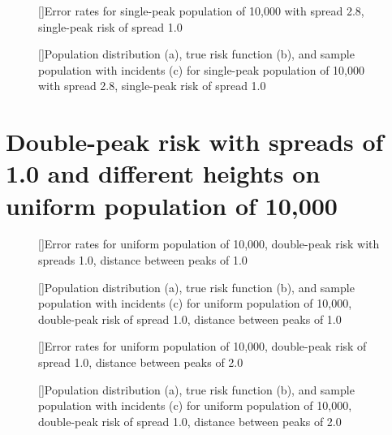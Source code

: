 {%

\begin{figure}[!htb]
    
    []{Error rates for single-peak population of 10,000 with \gls{spread} 2.8, single-peak risk of \gls{spread} 1.0}
    \label{tab:mean_error_rates:p2.8_100_1.0_1h}
    
    []{Population distribution (a), true risk function (b), and sample population with incidents (c) for single-peak population of 10,000 with \gls{spread} 2.8, single-peak risk of \gls{spread} 1.0}
    \label{fig:distributions:p2.8_100_1.0_1h}    
\end{figure}





\section[Double-peak risk with spreads of 1.0 and different heights]
    {Double-peak risk with spreads of 1.0 and different heights on uniform population of 10,000}
\label{sec:app:results_unif_100_1_2h_X}


\begin{figure}[!htb]
    
    []{Error rates for uniform population of 10,000, double-peak risk with \glspl{spread} 1.0, distance between peaks of 1.0}
    \label{tab:mean_error_rates:unif_100_1_2h_1}
    
    []{Population distribution (a), true risk function (b), and sample population with incidents (c) for uniform population of 10,000, double-peak risk of \gls{spread} 1.0, distance between peaks of 1.0}
    \label{fig:distributions:unif_100_1_2h_1}    
\end{figure}


\begin{figure}[!htb]
    
    []{Error rates for uniform population of 10,000, double-peak risk of \gls{spread} 1.0, distance between peaks of 2.0}
    \label{tab:mean_error_rates:unif_100_1_2h_2}
    
    []{Population distribution (a), true risk function (b), and sample population with incidents (c) for uniform population of 10,000, double-peak risk of \gls{spread} 1.0, distance between peaks of 2.0}
    \label{fig:distributions:unif_100_1_2h_2}    
\end{figure}

}
